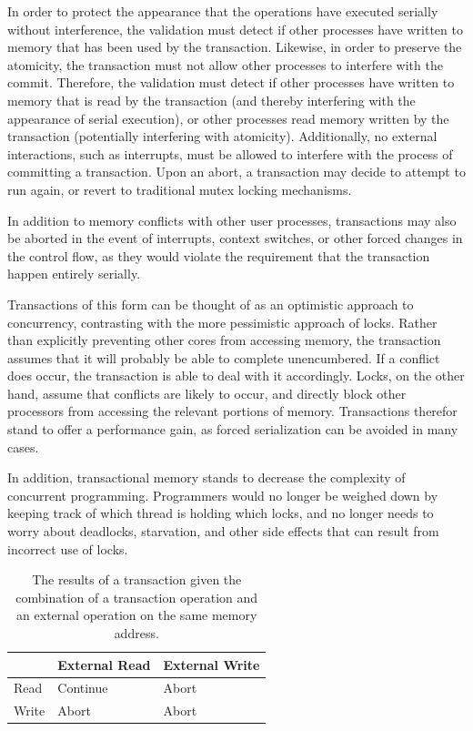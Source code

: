 \documentclass{acm_proc_article-sp}
\begin{document}
In order to protect the appearance that the operations have executed serially
without interference, the validation must detect if other processes have
written to memory that has been used by the transaction. Likewise, in order to
preserve the atomicity, the transaction must not allow other processes to
interfere with the commit. Therefore, the validation must detect if other
processes have written to memory that is read by the transaction (and thereby
interfering with the appearance of serial execution), or other processes read
memory written by the transaction (potentially interfering with atomicity).
Additionally, no external interactions, such as interrupts, must be allowed to
interfere with the process of committing a transaction.
Upon an abort, a transaction may decide to attempt to run again, or revert to
traditional mutex locking mechanisms.~\cite{Herlihy:1993:TMA:173682.165164}

In addition to memory conflicts with other user processes, transactions may
also be aborted in the event of interrupts, context switches, or other forced
changes in the control flow, as they would violate the requirement that the
transaction happen entirely serially. 

Transactions of this form can be thought of as an optimistic approach to
concurrency, contrasting with the more pessimistic approach of locks.  Rather
than explicitly preventing other cores from accessing memory, the transaction
assumes that it will probably be able to complete unencumbered. If a conflict
does occur, the transaction is able to deal with it accordingly.  Locks, on the
other hand, assume that conflicts are likely to occur, and directly block other
processors from accessing the relevant portions of memory.  Transactions
therefor stand to offer a performance gain, as forced serialization can be
avoided in many cases.

In addition, transactional memory stands to decrease the complexity of
concurrent programming. Programmers would no longer be weighed down by keeping
track of which thread is holding which locks, and no longer needs to worry
about deadlocks, starvation, and other side effects that can result from
incorrect use of locks.

\begin{table}
\begin{center}
    \begin{tabular}{ l | l | l }
     & External Read & External Write \\
    \hline
    Read & Continue & Abort \\
    \hline
    Write & Abort & Abort \\
    \hline
    \end{tabular}
    \caption{The results of a transaction given the combination of a transaction
            operation and an external operation on the same memory address.}
\label{results_table}
\end{center}
\end{table}
\end{document}
